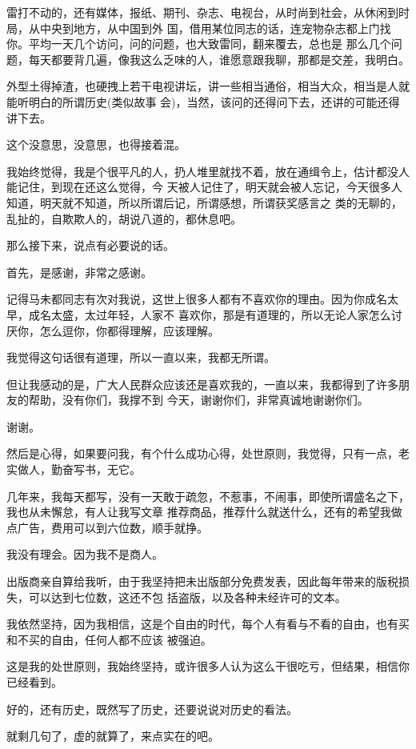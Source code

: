 \documentclass[11pt,a4paper,onecolumn]{article}
\begin{document}
雷打不动的，还有媒体，报纸、期刊、杂志、电视台，从时尚到社会，从休闲到时局，从中央到地方，从中国到外
国，借用某位同志的话，连宠物杂志都上门找你。平均一天几个访问，问的问题，也大致雷同，翻来覆去，总也是
那么几个问题，每天都要背几遍，像我这么乏味的人，谁愿意跟我聊，那都是交差，我明白。

外型土得掉渣，也硬拽上若干电视讲坛，讲一些相当通俗，相当大众，相当是人就能听明白的所谓历史(类似故事
会)，当然，该问的还得问下去，还讲的可能还得讲下去。

这个没意思，没意思，也得接着混。

我始终觉得，我是个很平凡的人，扔人堆里就找不着，放在通缉令上，估计都没人能记住，到现在还这么觉得，今
天被人记住了，明天就会被人忘记，今天很多人知道，明天就不知道，所以所谓后记，所谓感想，所谓获奖感言之
类的无聊的，乱扯的，自欺欺人的，胡说八道的，都休息吧。

那么接下来，说点有必要说的话。

首先，是感谢，非常之感谢。

记得马未都同志有次对我说，这世上很多人都有不喜欢你的理由。因为你成名太早，成名太盛，太过年轻，人家不
喜欢你，那是有道理的，所以无论人家怎么讨厌你，怎么逗你，你都得理解，应该理解。

我觉得这句话很有道理，所以一直以来，我都无所谓。

但让我感动的是，广大人民群众应该还是喜欢我的，一直以来，我都得到了许多朋友的帮助，没有你们，我撑不到
今天，谢谢你们，非常真诚地谢谢你们。

谢谢。

然后是心得，如果要问我，有个什么成功心得，处世原则，我觉得，只有一点，老实做人，勤奋写书，无它。

几年来，我每天都写，没有一天敢于疏忽，不惹事，不闹事，即使所谓盛名之下，我也从未懈怠，有人让我写文章
推荐商品，推荐什么就送什么，还有的希望我做点广告，费用可以到六位数，顺手就挣。

我没有理会。因为我不是商人。

出版商亲自算给我听，由于我坚持把未出版部分免费发表，因此每年带来的版税损失，可以达到七位数，这还不包
括盗版，以及各种未经许可的文本。

我依然坚持，因为我相信，这是个自由的时代，每个人有看与不看的自由，也有买和不买的自由，任何人都不应该
被强迫。

这是我的处世原则，我始终坚持，或许很多人认为这么干很吃亏，但结果，相信你已经看到。

好的，还有历史，既然写了历史，还要说说对历史的看法。

就剩几句了，虚的就算了，来点实在的吧。
\end{document}
